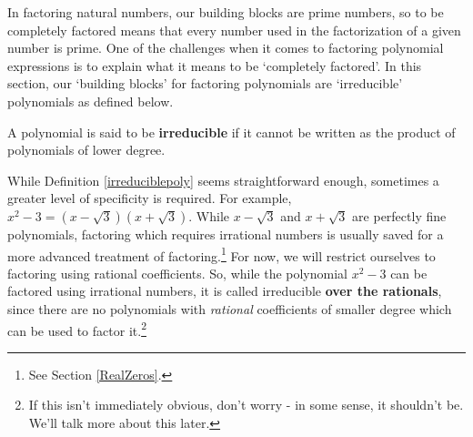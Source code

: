 \medskip

In factoring natural numbers, our building blocks are prime numbers, so to be completely factored means that every number used in the factorization of a given number is prime. One of the challenges when it comes to factoring polynomial expressions is to explain what it means to be `completely factored'. In this section, our `building blocks' for factoring polynomials are `irreducible' polynomials as defined below.


\begin{tcolorbox}
  
\begin{defn}\label{irreduciblepoly}  A polynomial is said to be \textbf{irreducible} if it cannot be written as the product of polynomials of lower degree.
\end{defn}

\end{tcolorbox}

While Definition \ref{irreduciblepoly} seems straightforward enough, sometimes a greater level of specificity is required. For example, $x^2 - 3 = (x-\sqrt{3})(x + \sqrt{3})$.  While $x-\sqrt{3}$ and $x+\sqrt{3}$ are perfectly fine polynomials, factoring which requires irrational numbers is usually saved for a more advanced treatment of factoring.\footnote{See Section \ref{RealZeros}.}  For now, we will restrict ourselves to factoring using rational coefficients. So, while the polynomial $x^2 - 3$ can be factored using irrational numbers, it is called irreducible \textbf{over the rationals}, since there are no polynomials with \textit{rational} coefficients of smaller degree which can be used to factor it.\footnote{If this isn't immediately obvious, don't worry - in some sense, it shouldn't be.  We'll talk more about this later.} 


